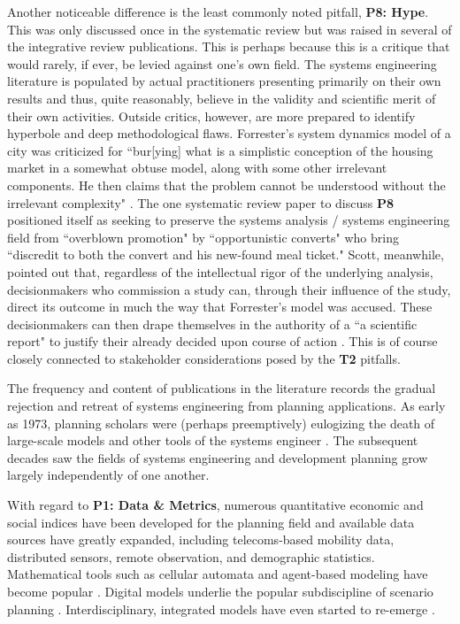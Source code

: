 Another noticeable difference is the least commonly noted pitfall, \textbf{P8: Hype}. This was only discussed once in the systematic review but was raised in several of the integrative review publications. This is perhaps because this is a critique that would rarely, if ever, be levied against one's own field. The systems engineering literature is populated by actual practitioners presenting primarily on their own results and thus, quite reasonably, believe in the validity and scientific merit of their own activities. Outside critics, however, are more prepared to identify hyperbole and deep methodological flaws. Forrester's system dynamics model of a city \cite{forresterUrbanDynamics1969} was criticized for ``bur[ying] what is a simplistic conception of the housing market in a somewhat obtuse model, along with some other irrelevant components. He then claims that the problem cannot be understood without the irrelevant complexity" \cite{leejrRequiemLargeScaleModels1973}. The one systematic review paper to discuss \textbf{P8} positioned itself as seeking to preserve the systems analysis / systems engineering field from ``overblown promotion" by ``opportunistic converts" who bring ``discredit to both the convert and his new-found meal ticket." \cite{brewerSystemsAnalysisUrban1973} Scott, meanwhile, pointed out that, regardless of the intellectual rigor of the underlying analysis, decisionmakers who commission a study can, through their influence of the study, direct its outcome in much the way that Forrester's model was accused. These decisionmakers can then drape themselves in the authority of a ``a scientific report" to justify their already decided upon course of action \cite{scottSeeingStateHow2020}. This is of course closely connected to stakeholder considerations posed by the \textbf{T2} pitfalls.


The frequency and content of publications in the literature records the gradual rejection and retreat of systems engineering from planning applications. As early as 1973, planning scholars were (perhaps preemptively) eulogizing the death of large-scale models and other tools of the systems engineer \cite{leejrRequiemLargeScaleModels1973}. The subsequent decades saw the fields of systems engineering and development planning grow largely independently of one another.

With regard to \textbf{P1: Data \& Metrics}, numerous quantitative economic and social indices have been developed for the planning field \cite{boyceFrameworkDefiningApplying1972, cliftonQuantitativeAnalysisUrban2008,readAssetbasedEconomicDevelopment2012,sawickiNeighborhoodIndicatorsReview1996,valRegionalLocalEconomic1991} and available data sources have greatly expanded, including telecoms-based mobility data, distributed sensors, remote observation, and demographic statistics. Mathematical tools such as cellular automata and agent-based modeling have become popular \cite{battyCitiesComplexity2005,laufUncoveringLanduseDynamics2012}. Digital models underlie the popular subdiscipline of scenario planning \cite{goodspeedScenarioPlanningCities2020,zapataRadicalUncertaintyScenario2015}. Interdisciplinary, integrated models have even started to re-emerge \cite{millerIntegratedUrbanModeling2018,moeckelTrendsIntegratedLanduse2018,shahumyanIntegrationLandUse2017}. 

